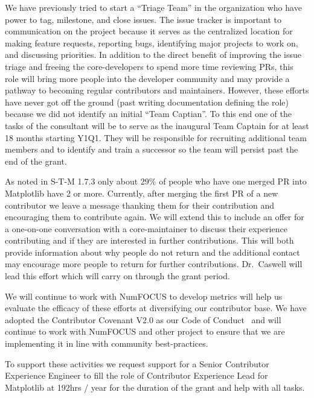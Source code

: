 \documentclass[12pt]{article}
\numberwithin{page}{section}
\begin{document}
We have previously tried to start a ``Triage Team'' in the organization who
have power to tag, milestone, and close issues.  The issue tracker is important
to communication on the project because it serves as the centralized location
for making feature requests, reporting bugs, identifying major projects to work
on, and discussing priorities.  In addition to the direct benefit of improving
the issue triage and freeing the core-developers to spend more time reviewing
PRs, this role will bring more people into the developer community and may
provide a pathway to becoming regular contributors and maintainers.  However,
these efforts have never got off the ground (past writing documentation
defining the role) because we did not identify an initial ``Team Captian''.  To
this end one of the tasks of the consultant will be to serve as the inaugural
Team Captain for at least 18 months starting Y1Q1.  They will be responsible
for recruiting additional team members and to identify and train a successor so
the team will persist past the end of the grant.

As noted in S-T-M 1.7.3 only about 29\% of people who have one merged PR into
Matplotlib have 2 or more.  Currently, after merging the first PR of a new
contributor we leave a message thanking them for their contribution and
encouraging them to contribute again.  We will extend this to include an offer
for a one-on-one conversation with a core-maintainer to discuss their
experience contributing and if they are interested in further contributions.
This will both provide information about why people do not return and the
additional contact may encourage more people to return for further
contributions.  Dr.\ Caswell will lead this effort which will carry on through
the grant period.
%

We will continue to work with NumFOCUS to develop metrics will help us evaluate
the efficacy of these efforts at diversifying our contributor base.  We have
adopted the Contributor Covenant V2.0 as our Code of Conduct~\cite{CoC} and
will continue to work with NumFOCUS and other project to ensure that we are
implementing it in line with community best-practices.



To support these activities we request support for a Senior Contributor
Experience Engineer to fill the role of Contributor Experience Lead for
Matplotlib at 192hrs / year for the duration of the grant and help with all
tasks.
\end{document}
